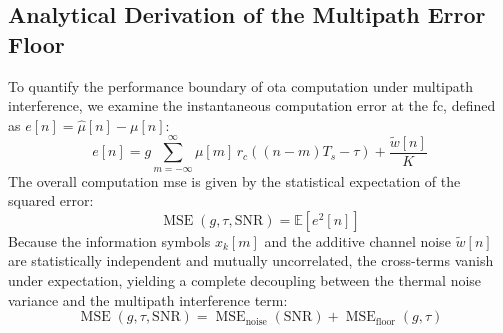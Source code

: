 \documentclass[Markos_Delaportas_1316.tex]{subfiles}
\begin{document}
\subsection{Analytical Derivation of the Multipath Error Floor}
\label{subsec:analytical_error_floor_derivation}
To quantify the performance boundary of \gls{ota} computation under
multipath interference, we examine the instantaneous
computation error at the \gls{fc}, defined as $e[n] = \hat{\mu}[n] - \mu[n]$:
\begin{equation}
    e[n] = g \sum_{m=-\infty}^{\infty} \mu[m] \, r_c((n-m)T_s - \tau)
    + \frac{\tilde{w}[n]}{K}
    \label{eq:total_computation_error}
\end{equation}
The overall computation \gls{mse} is given by the statistical
expectation of the squared error:
\begin{equation}
    \operatorname{MSE}(g, \tau, \text{SNR}) = \mathbb{E}\left[ e^2[n] \right]
    \label{eq:mse_definition}
\end{equation}
Because the information symbols $x_k[m]$ and the additive channel
noise $\tilde{w}[n]$ are statistically independent
and mutually uncorrelated, the cross-terms vanish under expectation,
yielding a complete decoupling between the
thermal noise variance and the multipath interference term:
\begin{equation}
    \operatorname{MSE}(g, \tau, \text{SNR}) =
    \operatorname{MSE}_{\text{noise}}(\text{SNR}) +
    \operatorname{MSE}_{\text{floor}}(g, \tau)
    \label{eq:mse_decoupling}
\end{equation}
\end{document}
